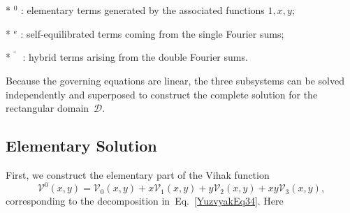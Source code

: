 * \(^{0}\) : elementary terms generated by the associated functions
\(1,x,y\);  

* \(^{\mathrm e}\) : self-equilibrated terms coming from the single
Fourier sums;  

* \(\tilde{\phantom{V}}\) : hybrid terms arising from the double Fourier
sums.

Because the governing equations are linear, the three subsystems can be
solved independently and superposed to construct the complete solution
for the rectangular domain~\(\mathcal D\).

\subsection{Elementary Solution}

First, we construct the elementary part of the Vihak function
\begin{equation}
	\mathcal V^{0}(x,y)
	= \mathcal V_{0}(x,y)
	+ x \mathcal V_{1}(x,y)
	+ y \mathcal V_{2}(x,y)
	+ xy \mathcal V_{3}(x,y),
	\label{YuzvyakEq36}
\end{equation}
corresponding to the decomposition in~Eq.~\eqref{YuzvyakEq34}.
Here
